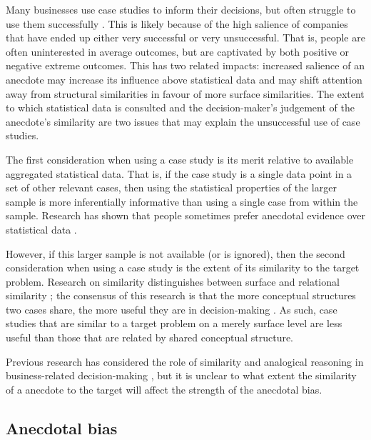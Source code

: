 \documentclass[a4paper, nobind, dvipsnames]{templates/ociamthesis}
\theoremstyle{definition}
\theoremstyle{definition}
\theoremstyle{definition}
\theoremstyle{definition}
\theoremstyle{remark}
\begin{document}
Many businesses use case studies to inform their decisions, but often struggle
to use them successfully \autocite{gavetti2005a}. This is likely because of the high
salience of companies that have ended up either very successful or very
unsuccessful. That is, people are often uninterested in average outcomes, but
are captivated by both positive or negative extreme outcomes. This has two
related impacts: increased salience of an anecdote may increase its influence
above statistical data and may shift attention away from structural similarities
in favour of more surface similarities. The extent to which statistical data is
consulted and the decision-maker's judgement of the anecdote's similarity are
two issues that may explain the unsuccessful use of case studies.

The first consideration when using a case study is its merit relative to
available aggregated statistical data. That is, if the case study is a single
data point in a set of other relevant cases, then using the statistical
properties of the larger sample is more inferentially informative than using a
single case from within the sample. Research has shown that people sometimes
prefer anecdotal evidence over statistical data \autocites[e.g.,][]{reinard1988,shen2015,jaramillo2019}.

However, if this larger sample is not available (or is ignored), then the second
consideration when using a case study is the extent of its similarity to the
target problem. Research on similarity distinguishes between surface and
relational similarity \autocite{gentner1983}; the consensus of this research is that the
more conceptual structures two cases share, the more useful they are in
decision-making \autocite{markman1995,lassaline1996}. As such, case studies that are
similar to a target problem on a merely surface level are less useful than those
that are related by shared conceptual structure.

Previous research has considered the role of similarity and analogical reasoning
in business-related decision-making \autocite{gavetti2005}, but it is unclear to what
extent the similarity of a anecdote to the target will affect the strength of
the anecdotal bias.

\hypertarget{anecdotal-bias}{%
\subsection{Anecdotal bias}\label{anecdotal-bias}}
\end{document}
